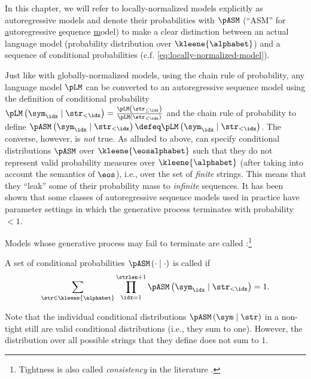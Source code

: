 In this chapter, we will refer to locally-normalized models explicitly as autoregressive models and denote their probabilities with $\pASM$ (``ASM'' for \underline{a}utoregressive \underline{s}equence \underline{m}odel) to make a clear distinction between an actual language model (probability distribution over $\kleene{\alphabet}$) and a sequence of conditional probabilities (c.f. \cref{eq:locally-normalized-model}).

Just like with globally-normalized models, using the chain rule of probability, any language model $\pLM$ can be converted to an autoregressive sequence model using the definition of conditional probability $\pLM\left(\sym_\idx\mid\str_{<\idx}\right) = \frac{\pLM\left(\str_{\leq\idx}\right)}{\pLM\left(\str_{<\idx}\right)}$ and the chain rule of probability to define $\pASM\left(\sym_\idx\mid\str_{<\idx}\right) \defeq \pLM\left(\sym_\idx\mid\str_{<\idx}\right)$.
The converse, however, is \emph{not} true.
As alluded to above, can specify conditional distributions $\pASM$ over $\kleene{\eosalphabet}$ such that they do not represent valid probability measures over $\kleene{\alphabet}$ (after taking into account the semantics of $\eos$), i.e., over the set of \emph{finite} strings.
This means that they ``leak'' some of their probability mass to \emph{infinite} sequences.
It has been shown that some classes of autoregressive sequence models used in practice have parameter settings in which the generative process terminates with probability $< 1$.

Models whose generative process may fail to terminate are called  \citep{Chi1999}:\footnote{Tightness is also called \emph{consistency} in the literature \citep{Booth1973, Chen2018}.} 
\begin{definition}
    A set of conditional probabilities $\pASM\left(\cdot \mid \cdot\right)$ is called  if
    \begin{equation}
        \sum_{\str \in \kleene{\alphabet}} \prod_{\idx 
= 1}^{\strlen + 1}\pASM\left(\sym_\idx\mid\str_{<\idx}\right) = 1.
    \end{equation}
\end{definition}

Note that the individual conditional distributions $\pASM\left(\sym \mid \str\right)$ in a non-tight \autoregmodelAcronym still are valid conditional distributions (i.e., they sum to one).
However, the distribution over all possible strings that they define does not sum to $1$.

